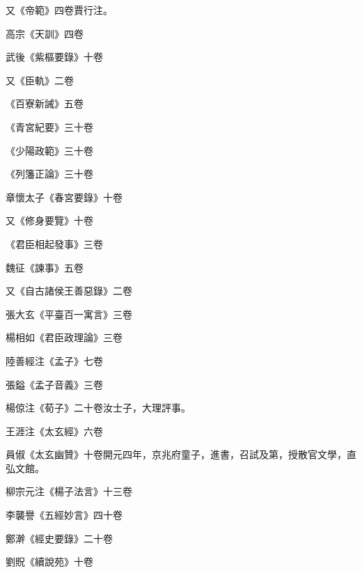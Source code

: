 \begin{pinyinscope}
 又《帝範》四卷賈行注。



 高宗《天訓》四卷



 武後《紫樞要錄》十卷



 又《臣軌》二卷



 《百寮新誡》五卷



 《青宮紀要》三十卷



 《少陽政範》三十卷



 《列籓正論》三十卷



 章懷太子《春宮要錄》十卷



 又《修身要覽》十卷



 《君臣相起發事》三卷



 魏征《諫事》五卷



 又《自古諸侯王善惡錄》二卷



 張大玄《平臺百一寓言》三卷



 楊相如《君臣政理論》三卷



 陸善經注《孟子》七卷



 張鎰《孟子音義》三卷



 楊倞注《荀子》二十卷汝士子，大理評事。



 王涯注《太玄經》六卷



 員俶《太玄幽贊》十卷開元四年，京兆府童子，進書，召試及第，授散官文學，直弘文館。



 柳宗元注《楊子法言》十三卷



 李襲譽《五經妙言》四十卷



 鄭澣《經史要錄》二十卷



 劉貺《續說苑》十卷




\end{pinyinscope}
